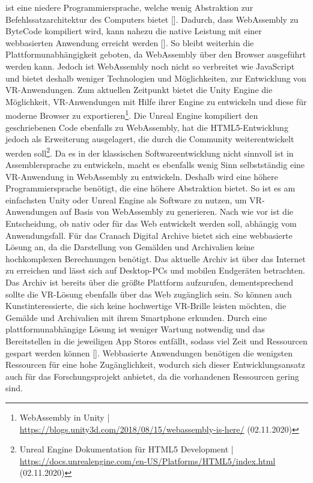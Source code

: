 \documentclass[a4paper,12pt,oneside]{article}
\begin{document}
        ist eine niedere Programmiersprache, welche wenig Abstraktion zur Befehlssatzarchitektur
        des Computers bietet [\cite[185]{Haas2017Jun}]. Dadurch, dass WebAssembly zu ByteCode
        kompiliert wird, kann nahezu die native Leistung mit einer webbasierten Anwendung 
        erreicht werden
        [\cite[186]{Haas2017Jun}]. So bleibt weiterhin die Plattformunabhängigkeit geboten,
        da WebAssembly über den Browser ausgeführt werden kann.
        Jedoch ist WebAssembly noch nicht
        so verbreitet wie JavaScript und bietet deshalb weniger Technologien und Möglichkeiten,
        zur Entwicklung von VR-Anwendungen. Zum aktuellen Zeitpunkt bietet die Unity Engine
        die Möglichkeit, VR-Anwendungen mit Hilfe ihrer Engine zu entwickeln und
        diese für moderne Browser zu exportieren\footnote{WebAssembly in Unity | \url{https://blogs.unity3d.com/2018/08/15/webassembly-is-here/} (02.11.2020)}.
        Die Unreal Engine kompiliert den geschriebenen Code ebenfalls zu WebAssembly,
        hat die HTML5-Entwicklung jedoch als Erweiterung ausgelagert, die durch
        die Community weiterentwickelt werden soll\footnote{Unreal Engine Dokumentation für HTML5 Development | \url{https://docs.unrealengine.com/en-US/Platforms/HTML5/index.html} (02.11.2020)}.
        Da es in der klassischen Softwareentwicklung nicht sinnvoll ist in Assemblersprache
        zu entwickeln, macht es ebenfalls wenig Sinn selbstständig eine VR-Anwendung in 
        WebAssembly zu entwickeln. Deshalb wird eine höhere Programmiersprache benötigt, die
        eine höhere Abstraktion bietet. So ist es am einfachsten Unity oder Unreal Engine 
        als Software zu nutzen,
        um VR-Anwendungen auf Basis von WebAssembly zu generieren.
        Nach wie vor ist die Entscheidung, ob nativ oder für das Web entwickelt werden soll, 
        abhängig vom Anwendungsfall. 
        Für das Cranach Digital Archive bietet sich eine webbasierte Lösung
        an, da die Darstellung von Gemälden und Archivalien keine hochkomplexen Berechnungen
        benötigt. Das aktuelle Archiv ist über das Internet zu erreichen und lässt sich auf
        Desktop-PCs und mobilen Endgeräten betrachten. Das Archiv ist bereits über die größte
        Plattform aufzurufen, dementsprechend sollte die VR-Lösung ebenfalls
        über das Web zugänglich sein. So können auch Kunstinteressierte, die sich keine hochwertige
        VR-Brille leisten möchten, die Gemälde und Archivalien mit ihrem Smartphone erkunden.
        Durch eine plattformunabhängige Lösung ist weniger Wartung notwendig und das
        Bereitstellen in die jeweiligen App Stores entfällt, sodass viel Zeit und
        Ressourcen gespart werden können [\cite[248]{Ater2017}]. Webbasierte Anwendungen 
        benötigen die wenigsten Ressourcen für eine hohe Zugänglichkeit, wodurch sich dieser
        Entwicklungsansatz auch für das Forschungsprojekt anbietet, da die vorhandenen 
        Ressourcen gering sind.
\end{document}
